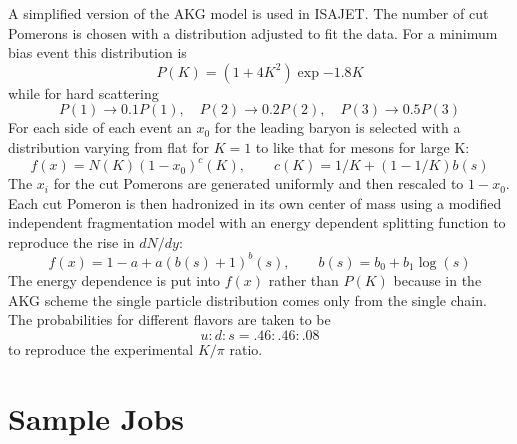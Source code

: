       A simplified version of the AKG model is used in ISAJET. The
number of cut Pomerons is chosen with a distribution adjusted to fit the
data. For a minimum bias event this distribution is
$$
P(K) = ( 1 + 4 K^2 ) \exp{-1.8 K}
$$
while for hard scattering
$$
P(1) \to 0.1 P(1),\quad  P(2) \to 0.2 P(2),\quad  P(3) \to 0.5 P(3)
$$
For each side of each event an $x_0$ for the leading baryon is selected
with a distribution varying from flat for $K = 1$ to like that for
mesons for large K:
$$
f(x) = N(K) (1- x_0)^c(K),\qquad c(K) = 1/K + ( 1 - 1/K ) b(s)
$$
The $x_i$ for the cut Pomerons are generated uniformly and then
rescaled to $1-x_0$. Each cut Pomeron is then hadronized in its own
center of mass using a modified independent fragmentation model with
an energy dependent splitting function to reproduce the rise in
$dN/dy$:
$$
f(x) = 1 - a  +  a(b(s) + 1)^ b(s),\qquad 
b(s) = b_0 + b_1  \log(s)
$$
The energy dependence is put into $f(x)$ rather than $P(K)$ because in
the AKG scheme the single particle distribution comes only from the
single chain. The probabilities for different flavors are taken to be
$$
u : d : s = .46 : .46 : .08
$$
to reproduce the experimental $K/\pi$ ratio.
\newpage
\section{Sample Jobs\label{SAMPLE}}

